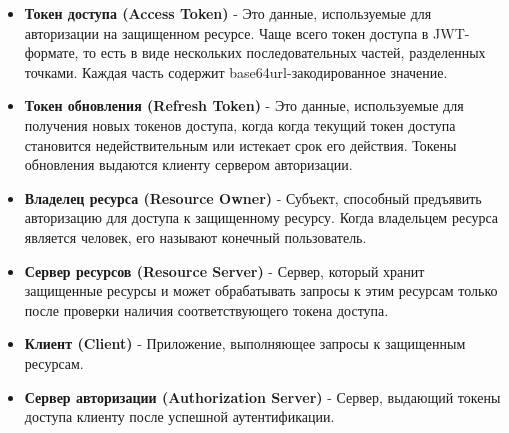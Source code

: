 \begin{itemize}
    \item \textbf{Токен доступа (Access Token)} - Это данные, используемые для авторизации на защищенном ресурсе.
    Чаще всего токен доступа в JWT-формате, то есть в виде нескольких последовательных частей,
    разделенных точками.
    Каждая часть содержит base64url-закодированное значение.
    \item \textbf{Токен обновления (Refresh Token)} - Это данные, используемые для получения новых токенов доступа, когда когда текущий токен
    доступа становится недействительным или истекает срок его действия.
    Токены обновления выдаются клиенту сервером авторизации.
    \item \textbf{Владелец ресурса (Resource Owner)} - Субъект, способный предъявить авторизацию для доступа к защищенному ресурсу.
    Когда владельцем ресурса является человек, его называют конечный пользователь.
    \item \textbf{Сервер ресурсов (Resource Server)} - Сервер, который хранит защищенные ресурсы и может обрабатывать запросы к этим ресурсам только
    после проверки наличия соответствующего токена доступа.
    \item \textbf{Клиент (Client)} - Приложение, выполняющее запросы к защищенным ресурсам.
    \item \textbf{Сервер авторизации (Authorization Server)} - Сервер, выдающий токены доступа клиенту после успешной аутентификации.
\end{itemize}